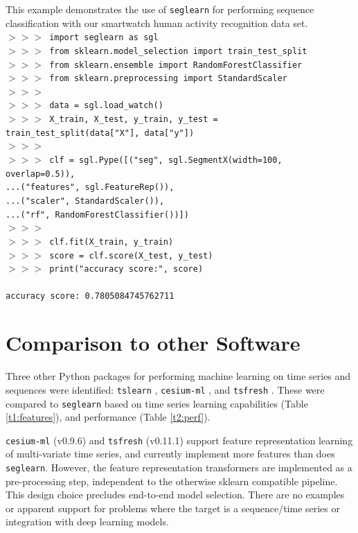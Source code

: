 \documentclass[twoside,11pt]{article}
\begin{document}
This example demonstrates the use of \texttt{seglearn} for performing sequence classification with our smartwatch human activity recognition data set.
\texttt{\\
$>>>$ import seglearn as sgl \\
$>>>$ from sklearn.model{\_}selection import train{\_}test{\_}split \\
$>>>$ from sklearn.ensemble import RandomForestClassifier \\
$>>>$ from sklearn.preprocessing import StandardScaler \\
$>>>$ \\
$>>>$ data = sgl.load{\_}watch() \\
$>>>$ X{\_}train, X{\_}test, y{\_}train, y{\_}test = train{\_}test{\_}split(data["X"], data["y"]) \\
$>>>$ \\
$>>>$ clf = sgl.Pype([("seg", sgl.SegmentX(width=100, overlap=0.5)), \\
...\hspace{106pt}("features", sgl.FeatureRep()), \\
...\hspace{106pt}("scaler", StandardScaler()), \\
...\hspace{106pt}("rf", RandomForestClassifier())]) \\
$>>>$ \\
$>>>$ clf.fit(X{\_}train, y{\_}train) \\
$>>>$ score = clf.score(X{\_}test, y{\_}test) \\
$>>>$ print("accuracy score:", score) \\\\
accuracy score: 0.7805084745762711 \\}


\section{Comparison to other Software}
Three other Python packages for performing machine learning on time series and sequences were identified: \texttt{tslearn} \citep{tavenard_tslearn:_2017}, \texttt{cesium-ml} \citep{naul_cesium:_2016}, and \texttt{tsfresh} \citep{christ_time_2018}. These were compared to \texttt{seglearn} based on time series learning capabilities (Table \ref{t1:features}), and performance (Table \ref{t2:perf}). 

\texttt{cesium-ml} (v0.9.6) and \texttt{tsfresh} (v0.11.1) support feature representation learning of multi-variate time series, and currently implement more features than does \texttt{seglearn}. However, the feature representation transformers are implemented as a pre-processing step, independent to the otherwise sklearn compatible pipeline. This design choice precludes end-to-end model selection. There are no examples or apparent support for problems where the target is a sequence/time series or integration with deep learning models. 
\end{document}
